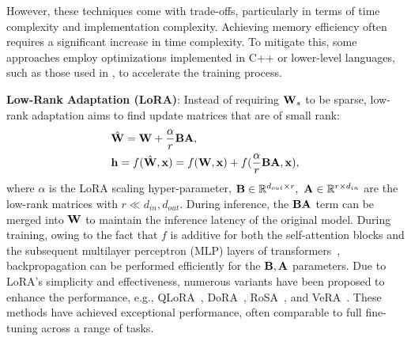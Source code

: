 However, these techniques come with trade-offs, particularly in terms of time complexity and implementation complexity. Achieving memory efficiency often requires a significant increase in time complexity. To mitigate this, some approaches employ optimizations implemented in C++ or lower-level languages, such as those used in \citep{gale2020sparse, pmlr-v202-nikdan23a, nikdan2024rosa}, to accelerate the training process. 

\textbf{Low-Rank Adaptation (LoRA)}: Instead of requiring ${\mathbf{W}}_s$ to be sparse, low-rank adaptation aims to find update matrices that are of small rank:
\begin{align}
    & \hat{{\mathbf{W}}}={\mathbf{W}} + \frac{\alpha}{r}{\mathbf{B}}{\mathbf{A}} \label{eq:lora_w}, \\
    & {\mathbf{h}} = f(\hat{{\mathbf{W}}}, {\mathbf{x}}) = f({\mathbf{W}}, {\mathbf{x}}) + f(\frac{\alpha}{r}{\mathbf{B}}{\mathbf{A}}, {\mathbf{x}}), \label{eq:lora_fwd}
\end{align}
where $\alpha$ is the LoRA scaling hyper-parameter, \iffalse $r$ is the middle dimensionality of the low-rank matrices, \fi${\mathbf{B}}\in \mathbb{R}^{d_{out}\times r},\ {\mathbf{A}}\in \mathbb{R}^{r\times d_{in}}$ are the low-rank matrices with $r\ll d_{in},d_{out}$. During inference, the ${\mathbf{B}} {\mathbf{A}}$ term can be merged into ${\mathbf{W}}$ to maintain the inference latency of the original model. During training, owing to the fact that $f$ is additive for both the self-attention blocks and the subsequent multilayer perceptron (MLP) layers of transformers~\citep{vaswani2017attention}, backpropagation can be performed efficiently for the ${\mathbf{B}}, {\mathbf{A}}$ parameters. Due to LoRA's simplicity and effectiveness, numerous variants have been proposed to enhance the performance, e.g., QLoRA~\citep{dettmers2022gpt3,guo2024lqlora,li2024loftq,dettmers2024qlora}, DoRA~\citep{liu2024dora}, RoSA~\citep{nikdan2024rosa}, and VeRA~\citep{kopiczko2024vera}. %
These methods have achieved exceptional performance, often comparable to full fine-tuning across a range of tasks.

%
%


